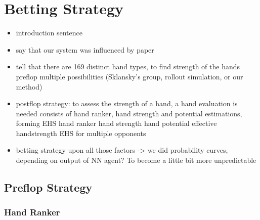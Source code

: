 \section{Betting Strategy}
\begin{itemize}
\item introduction sentence
\item say that our system was influenced by paper \cite{opp_modeling}
\item tell that there are 169 distinct hand types, to find strength of the hands preflop multiple possibilities (Sklansky's group, rollout simulation, or our method) 
\item postflop strategy:  to assess the strength of a hand, a hand evaluation is needed
\subitem consists of hand ranker, hand strength and potential estimations, forming EHS
\subitem hand ranker
\subitem hand strength
\subitem hand potential 
\subitem effective handstrength
\subsubitem EHS for multiple opponents
\item betting strategy upon all those factors -> we did probability curves, depending on output of NN agent? To become a little bit more unpredictable 
\end{itemize}
\subsection{Preflop Strategy}
\subsubsection{Hand Ranker}

